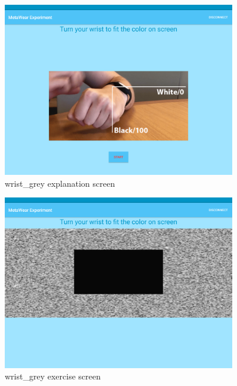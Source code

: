 \begin{figure}[h!]
\centering
\includegraphics[width=0.9\textwidth]{figures/tablet_screen13.png}
\caption{wrist\_grey explanation screen}
\label{appendix_app_screen_13}
\end{figure}

\begin{figure}[h!]
\centering
\includegraphics[width=0.9\textwidth]{figures/tablet_screen14.png}
\caption{wrist\_grey exercise screen}
\label{appendix_app_screen_14}
\end{figure}

